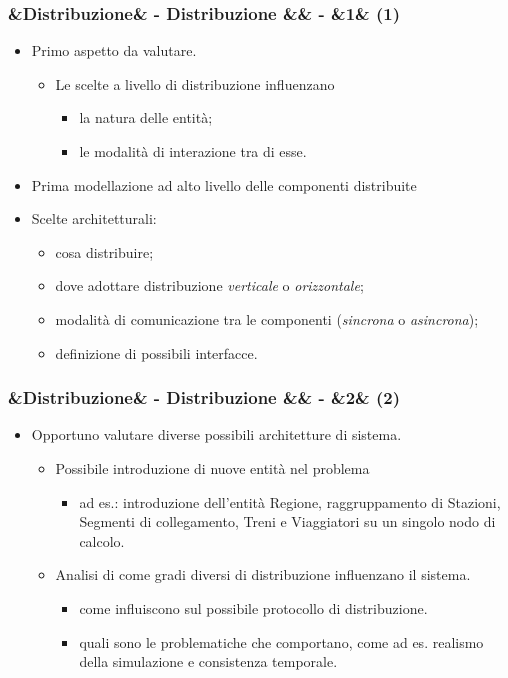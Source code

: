 \documentclass[slidestop,compress,blackandwhite]{beamer}
\newcommand{\ii}[1]{\textit{#1}}
\newcommand{\cm}[1]{\vspace{#1cm}}
\newcommand{\newtitle}[4]{
	#1 
	\ifx&#2&%
	\else
  		\large- #2
	\fi
	\ifx&#3&%
	\else
  		\normalsize- #3
	\fi
	\ifx&#4&%
	\else
  		\normalsize (#4)
	\fi
}
\newcommand{\newframe}[5]{
	\begin{frame}
		\frametitle{\newtitle{#1}{#2}{#3}{#4}}
		#5
	\end{frame}
}
\newcommand{\myitemize}[1]{
	\begin{itemize}\itemsep4pt
	#1
	\end{itemize}
}
\begin{document}
	
		\newframe{}{Distribuzione}{}{1}{
		\myitemize {
			\item Primo aspetto da valutare.
				\myitemize{
					\item Le scelte a livello di distribuzione influenzano
					\myitemize {
						\item la natura delle entità;\\
					 	\item le modalità di interazione tra di esse.
					}
				}
			\item Prima modellazione ad alto livello delle componenti distribuite
			\item Scelte architetturali:
				\myitemize{
					\item cosa distribuire;
					\item dove adottare distribuzione \ii{verticale} o \ii{orizzontale};
					\item modalità di comunicazione tra le componenti (\ii{sincrona} o \ii{asincrona});
					\item definizione di possibili interfacce.		
				}
		}
	}


	\newframe{}{Distribuzione}{}{2}{

		\myitemize {
			
			\cm{0.5}
			\item Opportuno valutare diverse possibili architetture di sistema.
				\cm{0.2}
				\myitemize {
					\item Possibile introduzione di nuove entità nel problema
					\myitemize {
						\item ad es.: introduzione dell'entità Regione, raggruppamento di Stazioni, Segmenti di collegamento, Treni e Viaggiatori su un singolo nodo di calcolo.
					}
					\cm{0.2}
					\item Analisi di come gradi diversi di distribuzione influenzano il sistema.%
					\myitemize {
						\item come influiscono sul possibile protocollo di distribuzione.
						\item quali sono le problematiche che comportano, come ad es. realismo della simulazione e consistenza temporale.
					}
				}
			
			
		}
	}
	
\end{document}
